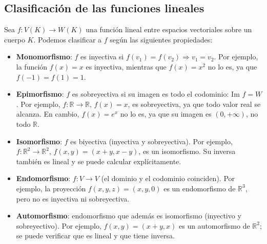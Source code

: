 \subsection{Clasificación de las funciones lineales}
\label{sec:clasificacion_de_funciones}

Sea \( f: V(K) \rightarrow W(K) \) una función lineal entre espacios vectoriales sobre un cuerpo \( K \). Podemos clasificar a \( f \) según las siguientes propiedades:

\begin{itemize}
  \item \textbf{Monomorfismo}: \( f \) es inyectiva si \( f(v_1) = f(v_2) \Rightarrow v_1 = v_2 \).  
  Por ejemplo, la función \( f(x) = x \) es inyectiva, mientras que \( f(x) = x^2 \) no lo es, ya que \( f(-1) = f(1) = 1 \).

  \item \textbf{Epimorfismo}: \( f \) es sobreyectiva si su imagen es todo el codominio: \( \text{Im } f = W \).  
  Por ejemplo, \( f: \mathbb{R} \to \mathbb{R} \), \( f(x) = x \), es sobreyectiva, ya que todo valor real se alcanza. En cambio, \( f(x) = e^x \) no lo es, ya que su imagen es \( (0, +\infty) \), no todo \( \mathbb{R} \).

  \item \textbf{Isomorfismo}: \( f \) es biyectiva (inyectiva y sobreyectiva).  
  Por ejemplo, \( f: \mathbb{R}^2 \to \mathbb{R}^2 \), \( f(x, y) = (x + y, x - y) \), es un isomorfismo. Su inversa también es lineal y se puede calcular explícitamente.

  \item \textbf{Endomorfismo}: \( f: V \to V \) (el dominio y el codominio coinciden).  
  Por ejemplo, la proyección \( f(x, y, z) = (x, y, 0) \) es un endomorfismo de \( \mathbb{R}^3 \), pero no es inyectiva ni sobreyectiva.

  \item \textbf{Automorfismo}: endomorfismo que además es isomorfismo (inyectivo y sobreyectivo).  
  Por ejemplo, \( f(x, y) = (x + y, x) \) es un automorfismo de \( \mathbb{R}^2 \); se puede verificar que es lineal y que tiene inversa.
\end{itemize}